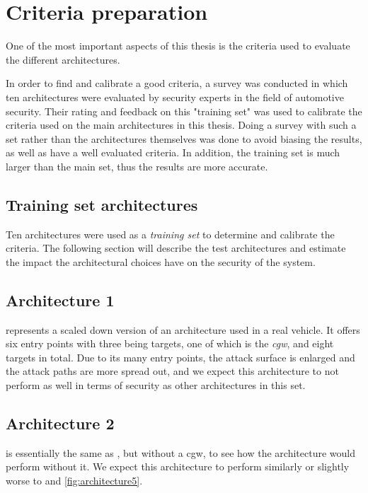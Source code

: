 \chapter{Criteria preparation}
\label{chp:introcriteria}

One of the most important aspects of this thesis is the criteria used to evaluate the different architectures.

In order to find and calibrate a good criteria, a survey was conducted in which ten architectures were evaluated by security experts in the field of automotive security.
Their rating and feedback on this "training set" was used to calibrate the criteria used on the main architectures in this thesis.
Doing a survey with such a set rather than the architectures themselves was done to avoid biasing the results, as well as have a well evaluated criteria.
In addition, the training set is much larger than the main set, thus the results are more accurate.

\section{Training set architectures}
\label{sec:trainingarch}

Ten architectures were used as a \textit{training set} to determine and calibrate the criteria.
The following section will describe the test architectures and estimate the impact the architectural choices have on the security of the system.

\section{Architecture 1}
\label{subsec:arch1}

 represents a scaled down version of an architecture used in a real vehicle.
It offers six entry points with three being targets, one of which is the \textit{\gls{cgw}}, and eight targets in total.
Due to its many entry points, the attack surface is enlarged and the attack paths are more spread out, 
and we expect this architecture to not perform as well in terms of security as other architectures in this set.

\section{Architecture 2}
\label{subsec:arch2}

 is essentially the same as ,
but without a \gls{cgw}, to see how the architecture would perform without it.
We expect this architecture to perform similarly or slightly worse to  and \ref{fig:architecture5}.


